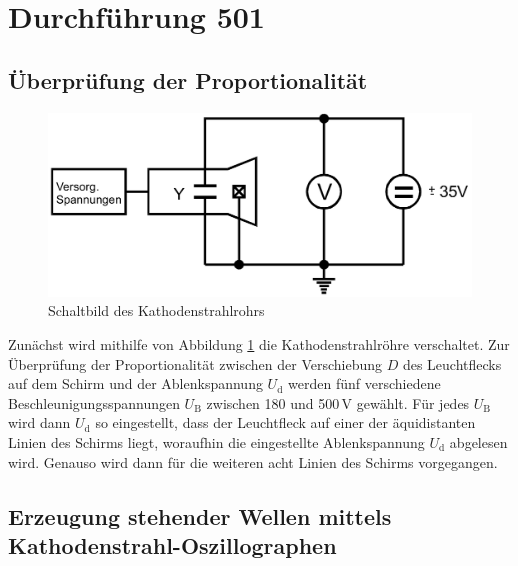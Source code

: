 \section{Durchführung 501}

\subsection{Überprüfung der Proportionalität}

\begin{figure}[h!]
	\centering
	\includegraphics[width=1\linewidth]{aufbau1.png}
	\caption{Schaltbild des Kathodenstrahlrohrs}
	\label{fig:aufbau1}
\end{figure}
Zunächst wird mithilfe von Abbildung \ref{fig:aufbau1} die Kathodenstrahlröhre verschaltet. Zur Überprüfung der Proportionalität zwischen der Verschiebung $D$ des Leuchtflecks auf dem Schirm und der Ablenkspannung $U_{\text{d}}$ 
werden fünf verschiedene Beschleunigungsspannungen $U_{\text{B}}$ zwischen 180 und 500\,V gewählt. Für jedes $U_{\text{B}}$ wird dann $U_{\text{d}}$ so eingestellt, dass der Leuchtfleck auf einer der äquidistanten Linien 
des Schirms liegt, woraufhin die eingestellte Ablenkspannung $U_{\text{d}}$ abgelesen wird. Genauso wird dann für die weiteren acht Linien des Schirms vorgegangen. 



\subsection{Erzeugung stehender Wellen mittels Kathodenstrahl-Oszillographen}

